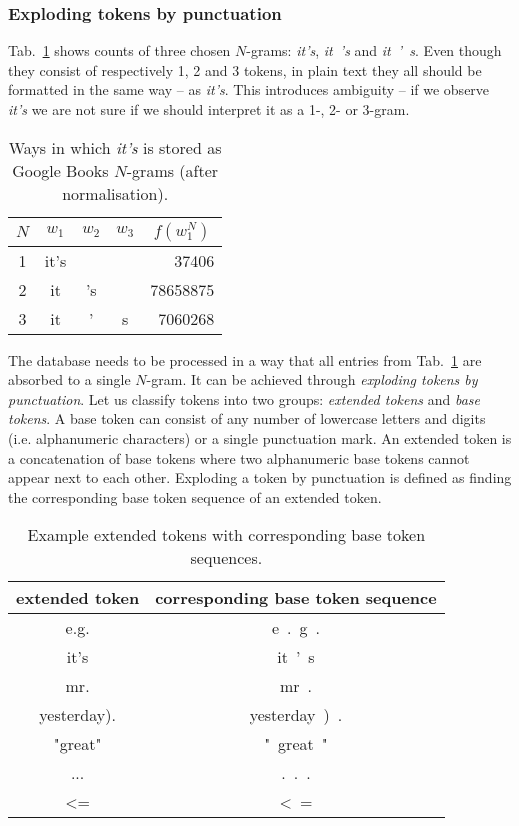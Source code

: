 \documentclass{IIBproject}
\makeatletter
\newcommand*{\ie}{i.e.\@\xspace}
\makeatother
\begin{document}
\subsubsection{Exploding tokens by punctuation}

Tab.~\ref{tab:its_ngrams} shows counts of three chosen $N$-grams: \emph{it's}, \emph{it\ 's} and \emph{it\ '\ s}. Even though they consist of respectively 1, 2 and 3 tokens, in plain text they all should be formatted in the same way -- as \emph{it's}. This introduces ambiguity -- if we observe \emph{it's} we are not sure if we should interpret it as a 1-, 2- or 3-gram.

\begin{table}[h]
	\centering
	\begin{tabular}{c | c | c | c | r}
	$N$ & $w_1$ & $w_2$ & $w_3$ & \multicolumn{1}{c}{$f(w_1^N)$} \\
	\hline
	1 & it's & & & \num{37406} \\
	2 & it & 's & & \num{78658875} \\
	3 & it & ' & s & \num{7060268}
	\end{tabular}
	\caption{\label{tab:its_ngrams}Ways in which \emph{it's} is stored as Google Books $N$-grams (after normalisation).}
\end{table}

The database needs to be processed in a way that all entries from Tab.~\ref{tab:its_ngrams} are absorbed to a single $N$-gram. It can be achieved through \emph{exploding tokens by punctuation}. Let us classify tokens into two groups: \emph{extended tokens} and \emph{base tokens}. A base token can consist of any number of lowercase letters and digits (\ie alphanumeric characters) or a single punctuation mark. An extended token is a concatenation of base tokens where two alphanumeric base tokens cannot appear next to each other. Exploding a token by punctuation is defined as finding the corresponding base token sequence of an extended token.

\begin{table}[h]
	\centering
	\begin{tabular}{c | c}
	extended token & corresponding base token sequence \\
	\hline
	e.g. & e\ .\ g\ . \\
	it's & it\ '\ s \\
	mr. & mr\ . \\
	yesterday). & yesterday\ )\ . \\
	"great" & "\ great\ " \\
	... & .\ .\ . \\
	\textless= & \textless\ =
	\end{tabular}
	\caption{\label{tab:extended_tokens}Example extended tokens with corresponding base token sequences.}
\end{table}
\end{document}
